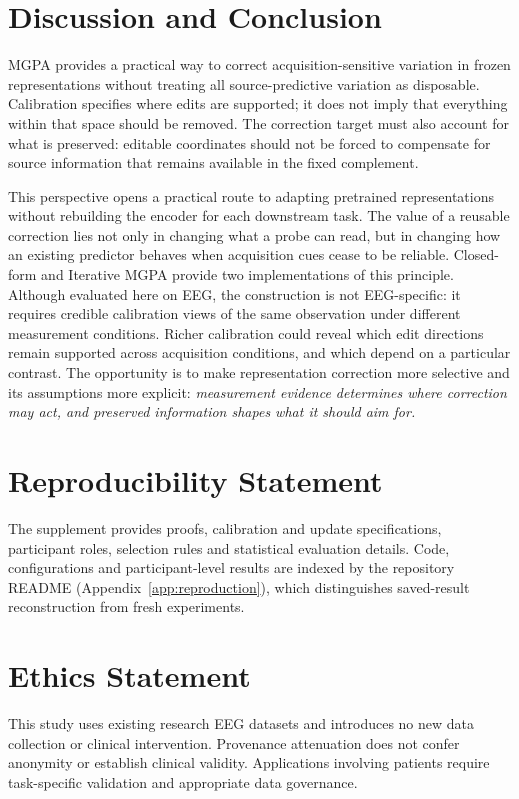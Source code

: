 \documentclass{article}
\theoremstyle{plain}
\theoremstyle{definition}
\begin{document}
\section{Discussion and Conclusion}
\label{sec:discussion}
MGPA provides a practical way to correct acquisition-sensitive variation in
frozen representations without treating all source-predictive variation as
disposable. Calibration specifies
where edits are supported; it does not imply that everything within that
space should be removed. The correction target must also account for what
is preserved: editable coordinates should not be forced to compensate for
source information that remains available in the fixed complement.

This perspective opens a practical route to adapting pretrained
representations without rebuilding the encoder for each downstream task.
The value of a reusable correction lies not only in changing what a
probe can read, but in changing how an existing predictor behaves when
acquisition cues cease to be reliable.
Closed-form and Iterative MGPA provide two implementations of this principle.
Although evaluated here on EEG, the construction is not EEG-specific: it
requires credible calibration views of the same observation under different
measurement conditions. Richer
calibration could reveal which edit directions remain supported across
acquisition conditions, and which depend on a particular contrast. The
opportunity is to make representation correction more selective and its
assumptions more explicit: \emph{measurement evidence determines where
correction may act, and preserved information shapes what it should aim for.}
\FloatBarrier
\label{sec:main-end}
\section*{Reproducibility Statement}
The supplement provides proofs, calibration and update specifications,
participant roles, selection rules and statistical evaluation details.
Code, configurations and participant-level results are indexed by the
repository README (Appendix~\ref{app:reproduction}), which distinguishes
saved-result reconstruction from fresh experiments.

\section*{Ethics Statement}
This study uses existing research EEG datasets and introduces no new data
collection or clinical intervention. Provenance attenuation does not confer
anonymity or establish clinical validity. Applications involving patients
require task-specific validation and appropriate data governance.
\end{document}

